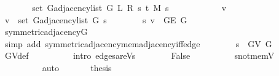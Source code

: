 \begin{isabellebody}
\ \ \isamarkupfalse%
\ \isamarkupfalse%
\ {\isachardoublequoteopen}{\isachardot}{\kern0pt}{\isachardot}{\kern0pt}{\isachardot}{\kern0pt}\ {\isacharequal}{\kern0pt}\ set\ {\isacharparenleft}{\kern0pt}G{\isachardot}{\kern0pt}adjacency{\isacharunderscore}{\kern0pt}list\ {\isacharparenleft}{\kern0pt}G{}\ L\ R\ s\ t\ M{\isacharparenright}{\kern0pt}\ s{\isacharparenright}{\kern0pt}{\isachardoublequoteclose}\isanewline
\ \ \isamarkupfalse%
\ {\isacharminus}{\kern0pt}\isanewline
\ \ \ \ \isacommand{{\isacharbraceleft}{\kern0pt}}\isamarkupfalse%
\ \isamarkupfalse%
\ v\isanewline
\ \ \ \ \ \ \isamarkupfalse%
\ {\isachardoublequoteopen}v\ {\isasymin}\ set\ {\isacharparenleft}{\kern0pt}G{\isachardot}{\kern0pt}adjacency{\isacharunderscore}{\kern0pt}list\ G\ s{\isacharparenright}{\kern0pt}{\isachardoublequoteclose}\isanewline
\ \ \ \ \ \ \isamarkupfalse%
\ {\isachardoublequoteopen}{\isacharbraceleft}{\kern0pt}s{\isacharcomma}{\kern0pt}\ v{\isacharbraceright}{\kern0pt}\ {\isasymin}\ G{\isachardot}{\kern0pt}E\ G{\isachardoublequoteclose}\isanewline
\ \ \ \ \ \ \ \ \isamarkupfalse%
\ symmetric{\isacharunderscore}{\kern0pt}adjacency{\isacharunderscore}{\kern0pt}G\isanewline
\ \ \ \ \ \ \ \ \isamarkupfalse%
\ {\isacharparenleft}{\kern0pt}simp\ add{\isacharcolon}{\kern0pt}\ symmetric{\isacharunderscore}{\kern0pt}adjacency{\isachardot}{\kern0pt}mem{\isacharunderscore}{\kern0pt}adjacency{\isacharunderscore}{\kern0pt}iff{\isacharunderscore}{\kern0pt}edge{\isacharparenright}{\kern0pt}\isanewline
\ \ \ \ \ \ \isamarkupfalse%
\ {\isachardoublequoteopen}s\ {\isasymin}\ G{\isachardot}{\kern0pt}V\ G{\isachardoublequoteclose}\isanewline
\ \ \ \ \ \ \ \ \isamarkupfalse%
\ G{\isachardot}{\kern0pt}V{\isacharunderscore}{\kern0pt}def\isanewline
\ \ \ \ \ \ \ \ \isamarkupfalse%
\ {\isacharparenleft}{\kern0pt}intro\ edges{\isacharunderscore}{\kern0pt}are{\isacharunderscore}{\kern0pt}Vs{\isacharparenright}{\kern0pt}\isanewline
\ \ \ \ \ \ \isamarkupfalse%
\ False\isanewline
\ \ \ \ \ \ \ \ \isamarkupfalse%
\ s{\isacharunderscore}{\kern0pt}not{\isacharunderscore}{\kern0pt}mem{\isacharunderscore}{\kern0pt}V\isanewline
\ \ \ \ \ \ \ \ \isamarkupfalse%
\ auto\ \isacommand{{\isacharbraceright}{\kern0pt}}\isamarkupfalse%
\isanewline
\ \ \ \ \isamarkupfalse%
\ {\isacharquery}{\kern0pt}thesis\isanewline
\ \ \ \ \ \ \isamarkupfalse%

\end{isabellebody}
